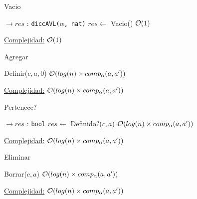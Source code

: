 \begin{Algoritmos}

\begin{algorithm}
\caption{Vacio}
\begin{algorithmic}[1]
$\to res$ : \texttt{diccAVL($\alpha$, nat)}
	\State $res \gets$ Vacio()
	\Comment $\mathcal{O}(1)$
\EndProcedure
\end{algorithmic}
\underline{Complejidad:} $\mathcal{O}(1)$
\end{algorithm}

\begin{algorithm}
\caption{Agregar}
\begin{algorithmic}[1]
	\State Definir($c, a, 0$)
	\Comment $\mathcal{O}(log(n) \times comp_{\alpha}(a, a'))$
\EndProcedure
\end{algorithmic}
\underline{Complejidad:} $\mathcal{O}(log(n) \times comp_{\alpha}(a, a'))$
\end{algorithm}

\begin{algorithm}
\caption{Pertenece?}
\begin{algorithmic}[1]
$\to res$ : \texttt{bool}
	\State $res \gets$ Definido?($c, a$)
	\Comment $\mathcal{O}(log(n) \times comp_{\alpha}(a, a'))$
\EndProcedure
\end{algorithmic}
\underline{Complejidad:} $\mathcal{O}(log(n) \times comp_{\alpha}(a, a'))$
\end{algorithm}

\begin{algorithm}
\caption{Eliminar}
\begin{algorithmic}[1]
	\State Borrar($c, a$)
	\Comment $\mathcal{O}(log(n) \times comp_{\alpha}(a, a'))$
\EndProcedure
\end{algorithmic}
\underline{Complejidad:} $\mathcal{O}(log(n) \times comp_{\alpha}(a, a'))$
\end{algorithm}
\end{Algoritmos}
